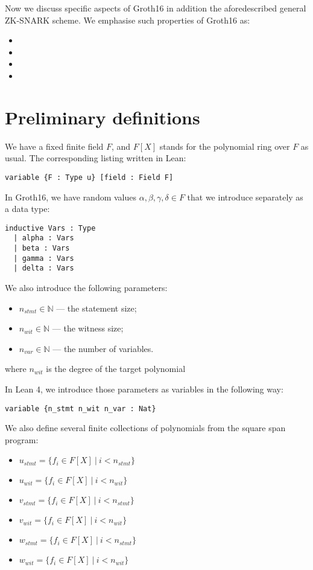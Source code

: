 \documentclass{article}
\theoremstyle{definition}
\theoremstyle{remark}
\begin{document}
Now we discuss specific aspects of Groth16 in addition the aforedescribed general ZK-SNARK scheme.
We emphasise such properties of Groth16 as:
\begin{itemize}
\item
\item
\item
\item
\end{itemize}

\section{Preliminary definitions}

We have a fixed finite field $F$, and $F[X]$ stands for the polynomial ring over $F$ as usual. The corresponding listing written in Lean:

\begin{lstlisting}
variable {F : Type u} [field : Field F]
\end{lstlisting}

In Groth16, we have random values $\alpha, \beta, \gamma, \delta \in F$ that we introduce separately as a data type:
\begin{lstlisting}
inductive Vars : Type
  | alpha : Vars
  | beta : Vars
  | gamma : Vars
  | delta : Vars
\end{lstlisting}

We also introduce the following parameters:

\begin{itemize}
\item $n_{stmt} \in \mathbb{N}$ --- the statement size;
\item $n_{wit} \in \mathbb{N}$ --- the witness size;
\item $n_{var} \in \mathbb{N}$ --- the number of variables.
\end{itemize}
where $n_{wit}$ is the degree of the target polynomial

In Lean 4, we introduce those parameters as variables in the following way:

\begin{lstlisting}
variable {n_stmt n_wit n_var : Nat}
\end{lstlisting}

We also define several finite collections of polynomials from the square span program:

\begin{itemize}
\item $u_{stmt} = \{ f_{i} \in F[X] \: | \: i < n_{stmt} \}$
\item $u_{wit} = \{ f_{i} \in F[X] \: | \: i < n_{wit} \}$
\item $v_{stmt} = \{ f_{i} \in F[X] \: | \: i < n_{stmt} \}$
\item $v_{wit} = \{ f_{i} \in F[X] \: | \: i < n_{wit} \}$
\item $w_{stmt} = \{ f_{i} \in F[X] \: | \: i < n_{stmt} \}$
\item $w_{wit} = \{ f_{i} \in F[X] \: | \: i < n_{wit} \}$
\end{itemize}
\end{document}
